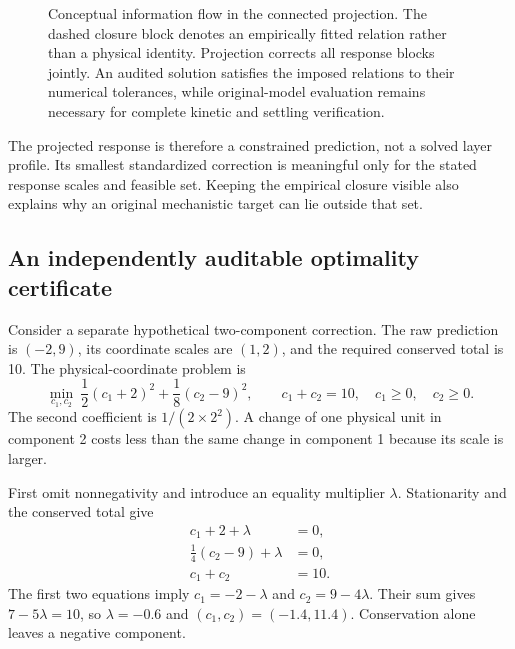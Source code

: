\begin{figure}[htbp]
\caption{Conceptual information flow in the connected projection. The dashed closure block denotes an empirically fitted relation rather than a physical identity. Projection corrects all response blocks jointly. An audited solution satisfies the imposed relations to their numerical tolerances, while original-model evaluation remains necessary for complete kinetic and settling verification.}
\label{fig:plant_projection_architecture}
\end{figure}

The projected response is therefore a constrained prediction, not a solved layer profile. Its smallest standardized correction is meaningful only for the stated response scales and feasible set. Keeping the empirical closure visible also explains why an original mechanistic target can lie outside that set.

\subsection{An independently auditable optimality certificate}

Consider a separate hypothetical two-component correction. The raw prediction is $(-2,9)$, its coordinate scales are $(1,2)$, and the required conserved total is 10. The physical-coordinate problem is
\begin{equation}
\min_{c_1,c_2}\ \frac12(c_1+2)^2+\frac18(c_2-9)^2,
\qquad c_1+c_2=10,\quad c_1\ge0,\quad c_2\ge0.
\end{equation}
The second coefficient is $1/(2\times2^2)$. A change of one physical unit in component 2 costs less than the same change in component 1 because its scale is larger.

First omit nonnegativity and introduce an equality multiplier $\lambda$. Stationarity and the conserved total give
\begin{align}
c_1+2+\lambda&=0,\\
\tfrac14(c_2-9)+\lambda&=0,\\
c_1+c_2&=10.
\end{align}
The first two equations imply $c_1=-2-\lambda$ and $c_2=9-4\lambda$. Their sum gives $7-5\lambda=10$, so $\lambda=-0.6$ and $(c_1,c_2)=(-1.4,11.4)$. Conservation alone leaves a negative component.

